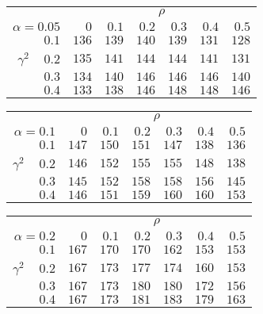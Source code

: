 \begin{tabular}{r|rrrrrr}
\hline\hline
 &\multicolumn{6}{c}{$\rho$} \\ 
 $\alpha = 0.05$ & $0$ & $0.1$ & $0.2$ & $0.3$ & $0.4$ & $0.5$ \\ 
 \hline$0.1$ & $136$ & $139$ & $140$ & $139$ & $131$ & $128$\\ 
$\gamma^2\;\;\;$ $0.2$ & $135$ & $141$ & $144$ & $144$ & $141$ & $131$\\ 
$0.3$ & $134$ & $140$ & $146$ & $146$ & $146$ & $140$\\ 
$0.4$ & $133$ & $138$ & $146$ & $148$ & $148$ & $146$\\ 
 \hline 
 \end{tabular}
 
 \vspace{2em} 
 
\begin{tabular}{r|rrrrrr}
\hline\hline
 &\multicolumn{6}{c}{$\rho$} \\ 
 $\alpha = 0.1$ & $0$ & $0.1$ & $0.2$ & $0.3$ & $0.4$ & $0.5$ \\ 
 \hline$0.1$ & $147$ & $150$ & $151$ & $147$ & $138$ & $136$\\ 
$\gamma^2\;\;\;$ $0.2$ & $146$ & $152$ & $155$ & $155$ & $148$ & $138$\\ 
$0.3$ & $145$ & $152$ & $158$ & $158$ & $156$ & $145$\\ 
$0.4$ & $146$ & $151$ & $159$ & $160$ & $160$ & $153$\\ 
 \hline 
 \end{tabular}
 
 \vspace{2em} 
 
\begin{tabular}{r|rrrrrr}
\hline\hline
 &\multicolumn{6}{c}{$\rho$} \\ 
 $\alpha = 0.2$ & $0$ & $0.1$ & $0.2$ & $0.3$ & $0.4$ & $0.5$ \\ 
 \hline$0.1$ & $167$ & $170$ & $170$ & $162$ & $153$ & $153$\\ 
$\gamma^2\;\;\;$ $0.2$ & $167$ & $173$ & $177$ & $174$ & $160$ & $153$\\ 
$0.3$ & $167$ & $173$ & $180$ & $180$ & $172$ & $156$\\ 
$0.4$ & $167$ & $173$ & $181$ & $183$ & $179$ & $163$\\ 
 \hline 
 \end{tabular}